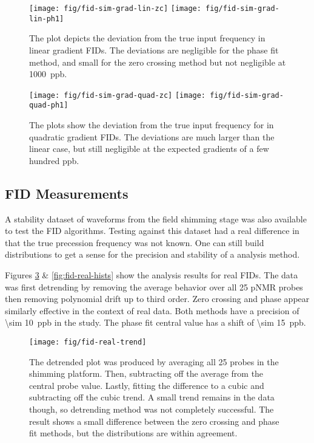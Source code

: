 \begin{figure}
\centering
\texttt{[image: fig/fid-sim-grad-lin-zc]}
\texttt{[image: fig/fid-sim-grad-lin-ph1]}
\caption{
    The plot depicts the deviation from the true input frequency in linear gradient FIDs.  The deviations are negligible for the phase fit method, and small for the zero crossing method but not negligible at \SI{1000}{ppb}.
    \label{fig:fid-sim-grad-lin-results}
} 
\end{figure}

\begin{figure}
\centering
\texttt{[image: fig/fid-sim-grad-quad-zc]}
\texttt{[image: fig/fid-sim-grad-quad-ph1]}
\caption{
    The plots show the deviation from the true input frequency for in quadratic gradient FIDs.  The deviations are much larger than the linear case, but still negligible at the expected gradients of a few hundred ppb.
    \label{fig:fid-sim-grad-quad-results}
}
\end{figure}

\subsection{FID Measurements}
A stability dataset of waveforms from the field shimming stage was also available to test the FID algorithms.  Testing against this dataset had a real difference in that the true precession frequency was not known.  One can still build distributions to get a sense for the precision and stability of a analysis method.

Figures \ref{fig:fid-real-trend} \& \ref{fig:fid-real-hists} show the analysis results for real FIDs.  The data was first detrending by removing the average behavior over all 25 pNMR probes then removing polynomial drift up to third order.  Zero crossing and phase appear similarly effective in the context of real data.  Both methods have a precision of \SI{\sim 10}{ppb} in the study.  The phase fit central value has a shift of \SI{\sim 15}{ppb}.

\begin{figure}
\centering
\texttt{[image: fig/fid-real-trend]}
\caption{
    The detrended plot was produced by averaging all 25 probes in the shimming platform.  Then, subtracting off the average from the central probe value.  Lastly, fitting the difference to a cubic and subtracting off the cubic trend.  A small trend remains in the data though, so detrending method was not completely successful.  The result shows a small difference between the zero crossing and phase fit methods, but the distributions are within agreement.
    \label{fig:fid-real-trend}
}
\end{figure}

